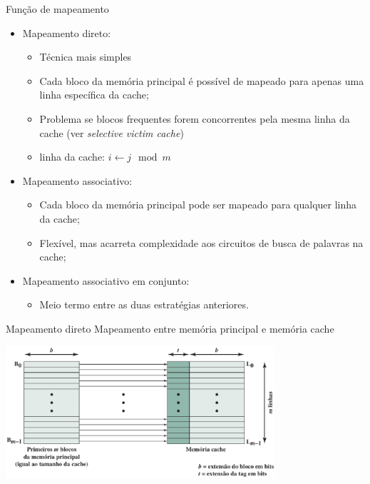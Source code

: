 \begin{slide}{Função de mapeamento}
\begin{itemize}
 \item Mapeamento direto:
 \begin{itemize}
    \item Técnica mais simples
    \item Cada bloco da memória principal é possível de mapeado para apenas uma linha específica da cache;
    \item Problema se blocos frequentes forem concorrentes pela mesma linha da cache (ver \emph{selective victim cache})
    \item linha da cache:  $i \leftarrow j\mod m$
 \end{itemize}\pause
 \item Mapeamento associativo:
 \begin{itemize}
    \item Cada bloco da memória principal pode ser mapeado para qualquer linha da cache;
    \item Flexível, mas acarreta complexidade aos circuitos de busca de palavras na cache;
 \end{itemize}\pause
 \item Mapeamento associativo em conjunto:
 \begin{itemize}
    \item Meio termo entre as duas estratégias anteriores.
 \end{itemize}
\end{itemize}
\end{slide}

\begin{slide}{Mapeamento direto}
	Mapeamento entre memória principal e memória cache
	\begin{center}
		\includegraphics[width=0.75\textwidth]{figs/mapeamento-direto}
	\end{center}
\end{slide}

